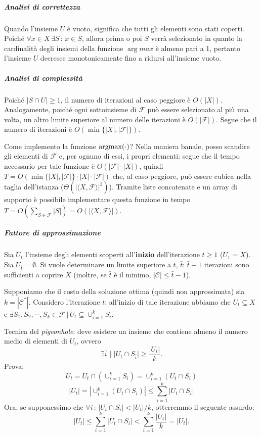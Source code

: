 \subparagraph{Analisi di correttezza} Quando l'insieme $U$ è vuoto, significa che tutti gli elementi sono stati coperti. Poiché $\forall x \in X \, \exists S \, : \, x \in S$, allora prima o poi $S$ verrà selezionato in quanto la cardinalità degli insiemi della funzione $\arg max$ è almeno pari a 1, pertanto l'insieme $U$ decresce monotonicamente fino a ridursi all'insieme vuoto.

\subparagraph{Analisi di complessità} Poiché $|S\cap U|\geq 1$, il numero di iterazioni al caso peggiore è $O(|X|)$. Analogamente, poiché ogni sottoinsieme di $\mathcal{F}$ può essere selezionato al più una volta, un altro limite superiore al numero delle iterazioni è $O(|\mathcal{F}|)$. Segue che il numero di iterazioni è $O(\min\{|X|,|\mathcal{F}|\})$.

Come implemento la funzione $\operatorname*{argmax} (\cdot)$? Nella maniera banale, posso scandire gli elementi di $\mathcal{F}$ e, per ognuno di essi, i propri elementi: segue che il tempo necessario per tale funzione è $O(|\mathcal{F}|\cdot|X|)$, quindi $T=O(\min\{|X|,|\mathcal{F}|\}\cdot|X|\cdot|\mathcal{F}|)$ che, al caso peggiore, può essere cubica nella taglia dell'istanza ($\Theta(|\langle X,\mathcal{F} \rangle|^3)$). Tramite liste concatenate e un array di supporto è possibile implementare questa funzione in tempo $T=O(\sum_{S\in\mathcal{F}}|S|)=O(|\langle X,\mathcal{F} \rangle|)$.

\subparagraph{Fattore di approssimazione}
Sia $U_t$ l'insieme degli elementi scoperti all'\textbf{inizio} dell'iterazione $t\geq 1$ ($U_1 = X$). Sia $U_{\bar{t}}=\emptyset$. Si vuole determinare un limite superiore a $t$, $\bar{t}$: $\bar{t}-1$ iterazioni sono sufficienti a coprire $X$ (inoltre, se $\bar{t}$ è il minimo, $|\mathcal{C}| \leq \bar{t}-1$).

Supponiamo che il costo della soluzione ottima (quindi non approssimata) sia $k=|\mathcal{C^*}|$.
Considero l'iterazione $t$: all'inizio di tale iterazione abbiamo che $U_t \subseteq X$ e $\exists S_1, S_2, \cdots, S_k \in \mathcal{F} \, | \, U_t \subseteq \cup_{i=1}^{k}S_i$.

Tecnica del \textit{pigeonhole}: deve esistere un insieme che contiene almeno il numero medio di elementi di $U_t$, ovvero
\[
\exists \bar{i} \,\, | \,\, |U_t \cap S_{\bar{i}}| \geq \frac{|U_t|}{k}.
\]
Prova:
\[
U_t = U_t \cap (\cup_{i=1}^k S_i) = \cup_{i=1}^k (U_t \cap S_i)
\]
\[
|U_t| = |\cup_{i=1}^k (U_t \cap S_i)| \leq \sum_{i=1}^k |U_t \cap S_i|
\]
Ora, se supponessimo che $\forall i \, : \, |U_t \cap S_i| < |U_t|/k$, otterremmo il seguente assurdo:
\[
|U_t| \leq \sum_{i=1}^k |U_t \cap S_i| < \sum_{i=1}^k \frac{|U_t|}{k} = |U_t|.
\]

